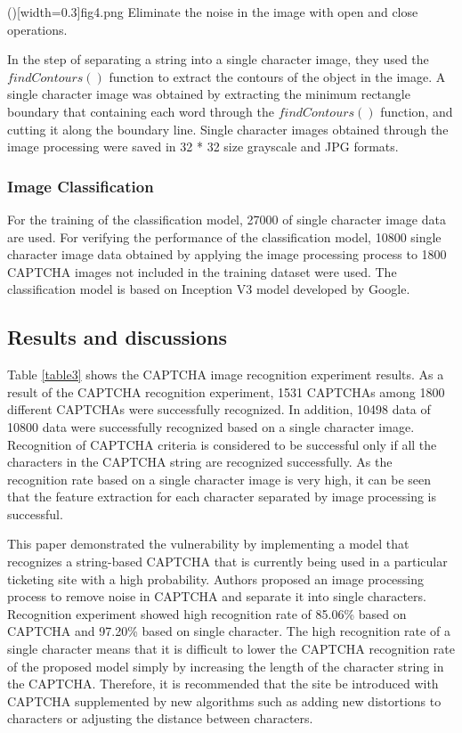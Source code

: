 \documentclass{ieeeaccess}
\begin{document}
\Figure[t]()[width=0.3\textwidth]{fig4.png}
   {Eliminate the noise in the image with open and close operations.\label{fig4}}

In the step of separating a string into a single character image, they used the $findContours()$ function to extract the contours of the object in the image. 
A single character image was obtained by extracting the minimum rectangle boundary that containing each word through the $findContours()$ function, and cutting it along the boundary line. Single character images obtained through the image processing were saved in 32 * 32 size grayscale and JPG formats.

\subsubsection{Image Classification}
For the training of the classification model, 27000 of single character image data are used.
For verifying the performance of the classification model, 10800 single character image data obtained by applying the image processing process to 1800 CAPTCHA images not included in the training dataset were used.
The classification model is based on Inception V3 model developed by Google.

\subsection{Results and discussions}
Table \ref{table3} shows the CAPTCHA image recognition experiment results.
As a result of the CAPTCHA recognition experiment, 1531 CAPTCHAs among 1800 different CAPTCHAs were successfully recognized. 
In addition, 10498 data of 10800 data were successfully recognized based on a single character image.
Recognition of CAPTCHA criteria is considered to be successful only if all the characters in the CAPTCHA string are recognized successfully.
As the recognition rate based on a single character image is very high, it can be seen that the feature extraction for each character separated by image processing is successful.

This paper demonstrated the vulnerability by implementing a model that recognizes a string-based CAPTCHA that is currently being used in a particular ticketing site with a high probability.
Authors proposed an image processing process to remove noise in CAPTCHA and separate it into single characters.
Recognition experiment showed high recognition rate of 85.06\% based on CAPTCHA and 97.20\% based on single character.
The high recognition rate of a single character means that it is difficult to lower the CAPTCHA recognition rate of the proposed model simply by increasing the length of the character string in the CAPTCHA.
Therefore, it is recommended that the site be introduced with CAPTCHA supplemented by new algorithms such as adding new distortions to characters or adjusting the distance between characters.
\end{document}
